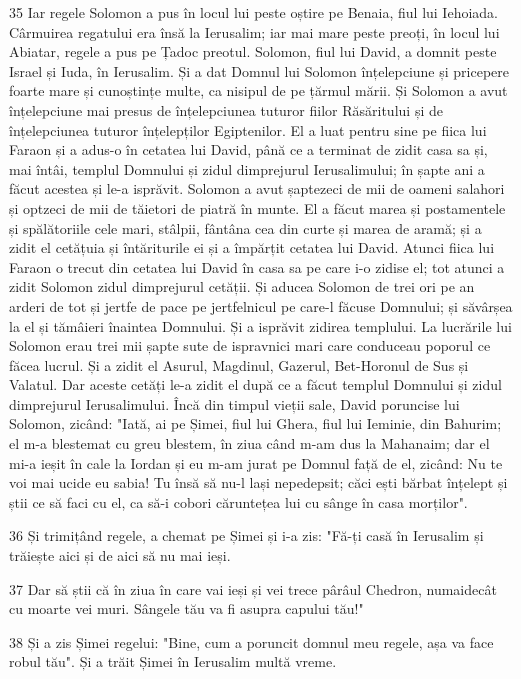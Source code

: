 \par 35 Iar regele Solomon a pus în locul lui peste oștire pe Benaia, fiul lui Iehoiada. Cârmuirea regatului era însă la Ierusalim; iar mai mare peste preoți, în locul lui Abiatar, regele a pus pe Țadoc preotul. Solomon, fiul lui David, a domnit peste Israel și Iuda, în Ierusalim. Și a dat Domnul lui Solomon înțelepciune și pricepere foarte mare și cunoștințe multe, ca nisipul de pe țărmul mării. Și Solomon a avut înțelepciune mai presus de înțelepciunea tuturor fiilor Răsăritului și de înțelepciunea tuturor înțelepților Egiptenilor. El a luat pentru sine pe fiica lui Faraon și a adus-o în cetatea lui David, până ce a terminat de zidit casa sa și, mai întâi, templul Domnului și zidul dimprejurul Ierusalimului; în șapte ani a făcut acestea și le-a isprăvit. Solomon a avut șaptezeci de mii de oameni salahori și optzeci de mii de tăietori de piatră în munte. El a făcut marea și postamentele și spălătoriile cele mari, stâlpii, fântâna cea din curte și marea de aramă; și a zidit el cetățuia și întăriturile ei și a împărțit cetatea lui David. Atunci fiica lui Faraon o trecut din cetatea lui David în casa sa pe care i-o zidise el; tot atunci a zidit Solomon zidul dimprejurul cetății. Și aducea Solomon de trei ori pe an arderi de tot și jertfe de pace pe jertfelnicul pe care-l făcuse Domnului; și săvârșea la el și tămâieri înaintea Domnului. Și a isprăvit zidirea templului. La lucrările lui Solomon erau trei mii șapte sute de ispravnici mari care conduceau poporul ce făcea lucrul. Și a zidit el Asurul, Magdinul, Gazerul, Bet-Horonul de Sus și Valatul. Dar aceste cetăți le-a zidit el după ce a făcut templul Domnului și zidul dimprejurul Ierusalimului. Încă din timpul vieții sale, David poruncise lui Solomon, zicând: "Iată, ai pe Șimei, fiul lui Ghera, fiul lui Ieminie, din Bahurim; el m-a blestemat cu greu blestem, în ziua când m-am dus la Mahanaim; dar el mi-a ieșit în cale la Iordan și eu m-am jurat pe Domnul față de el, zicând: Nu te voi mai ucide eu sabia! Tu însă să nu-l lași nepedepsit; căci ești bărbat înțelept și știi ce să faci cu el, ca să-i cobori căruntețea lui cu sânge în casa morților".
\par 36 Și trimițând regele, a chemat pe Șimei și i-a zis: "Fă-ți casă în Ierusalim și trăiește aici și de aici să nu mai ieși.
\par 37 Dar să știi că în ziua în care vai ieși și vei trece pârâul Chedron, numaidecât cu moarte vei muri. Sângele tău va fi asupra capului tău!"
\par 38 Și a zis Șimei regelui: "Bine, cum a poruncit domnul meu regele, așa va face robul tău". Și a trăit Șimei în Ierusalim multă vreme.
